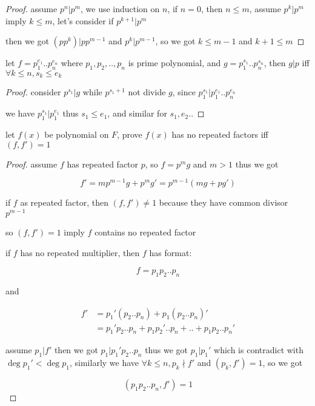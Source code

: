 \begin{proof}
    assume $p^n | p^m$, we use induction on $n$, if $n = 0$, then $n \le m$, assume $p^k | p^m$ imply $k \le m$, let's consider if $p^{k+1} | p^m$
    
    then we got $(pp^k) | pp^{m-1}$ and $p^{k} | p^{m-1}$, so we got $k \le m -1$ and $k + 1 \le m$
\end{proof}

\begin{exercise}
    let $f = p_1^{e_1}..p_n^{e_n}$ where $p_1,p_2,..,p_n$ is prime  polynomial,
    and $g = p_1^{s_1}..p_n^{s_n}$, then $g | p$ iff $\forall k \le n, s_k \le e_k$
\end{exercise}

\begin{proof}
    consider $p^{s_1} | g$ while $p^{s_1+1}$ not divide $g$, since $p_1^{s_1} | p_1^{e_1}..p_n^{e_n}$ 
    
    we have $p_1^{s_1} | p_1^{e_1}$ thus $s_1 \le e_1$, and similar for $s_1,e_2 ..$
\end{proof}

\begin{exercise}
    let $f(x)$ be polynomial on $F$, prove $f(x)$ has no repeated factors iff
    $(f, f') = 1$
\end{exercise}

\begin{proof}
    assume $f$ has repeated factor $p$, so $f = p^m g$ and $m > 1$ 
    thus we got

    \[
        f' = mp^{m-1}g + p^mg' = p^{m-1}(mg + pg')
    \]

    if $f$ as repeated factor, then $(f,f') \ne 1$ because they have common divisor $p^{m-1}$

    so $(f,f') = 1$ imply $f$ contains no repeated factor

    if $f$ has no repeated multiplier, then $f$ has format:

    \[
        f = p_1p_2..p_n 
    \]

   and 

   \begin{align*}
    f' &= p_1'(p_2..p_n) + p_1(p_2..p_n)' \\
    &= p_1'p_2..p_n + p_1p_2'..p_n + .. + p_1p_2..p_n'
   \end{align*}

   assume $p_1 | f'$ then we got $p_1|p_1'p_2..p_n$ thus we got $p_1 | p_1'$ which is contradict with $\deg p_1' < \deg p_1$,
   similarly we have $\forall k \le n, p_k \nmid f'$ and $(p_k, f') = 1$, so we got

   \[
    (p_1p_2..p_n, f') = 1
   \]

\end{proof}

